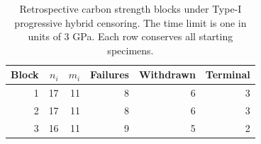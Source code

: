 \begin{table}[htbp]
\centering
\caption{Retrospective carbon strength blocks under Type-I progressive hybrid censoring. The time limit is one in units of 3 GPa. Each row conserves all starting specimens.}\label{tab:carbon-sampling}
\small
\begin{tabular}{rrrrrr}
\toprule
Block & $n_i$ & $m_i$ & Failures & Withdrawn & Terminal \\
\midrule
1 & 17 & 11 & 8 & 6 & 3 \\
2 & 17 & 11 & 8 & 6 & 3 \\
3 & 16 & 11 & 9 & 5 & 2 \\
\bottomrule
\end{tabular}
\end{table}
